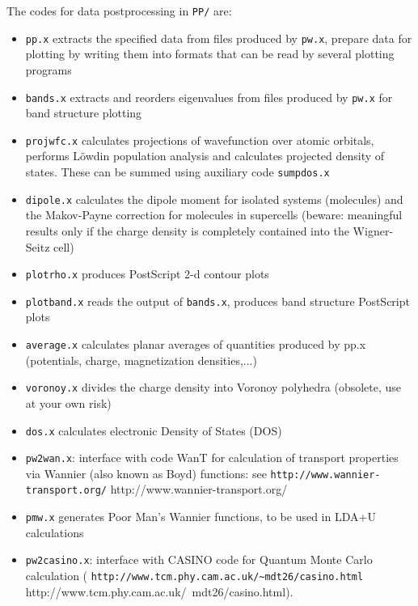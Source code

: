 \documentclass[12pt,a4paper]{article}
\begin{document}
The codes for data postprocessing in \texttt{PP/} are:
\begin{itemize}
  \item \texttt{pp.x} extracts the specified data from files
        produced by \texttt{pw.x}, prepare data for plotting
        by writing them into formats that can be read by
        several plotting programs
  \item \texttt{bands.x} extracts and reorders eigenvalues
        from files produced by \texttt{pw.x} for band structure plotting
  \item \texttt{projwfc.x} calculates projections of wavefunction
        over atomic orbitals, performs L\"owdin population
        analysis and calculates projected density of states. 
        These can be summed using auxiliary code \texttt{sumpdos.x}
  \item \texttt{dipole.x} calculates the dipole moment for
        isolated systems (molecules) and the Makov-Payne correction
        for molecules in supercells (beware: meaningful results 
        only if the charge density is completely contained into 
        the Wigner-Seitz cell)
  \item \texttt{plotrho.x} produces PostScript 2-d contour plots
  \item \texttt{plotband.x} reads the output of \texttt{bands.x},
        produces band structure PostScript plots
  \item \texttt{average.x} calculates planar averages of quantities
        produced by pp.x (potentials, charge, magnetization densities,...)
  \item \texttt{voronoy.x} divides the charge density into Voronoy
        polyhedra (obsolete, use at your own risk)
  \item \texttt{dos.x} calculates electronic Density of States
        (DOS)
  \item \texttt{pw2wan.x}: interface with code WanT for calculation
        of transport properties via Wannier (also known as Boyd)
        functions: see\hfill\break
        \htmladdnormallink%
        {\texttt{http://www.wannier-transport.org/}}%
        {http://www.wannier-transport.org/}
  \item \texttt{pmw.x} generates Poor Man's Wannier functions,
        to be used in LDA+U calculations
  \item \texttt{pw2casino.x}: interface with CASINO code for Quantum
        Monte Carlo calculation
        (\htmladdnormallink%
         {\texttt{http://www.tcm.phy.cam.ac.uk/\~{}mdt26/casino.html}}%
         {http://www.tcm.phy.cam.ac.uk/~mdt26/casino.html}).
\end{itemize}
\end{document}

